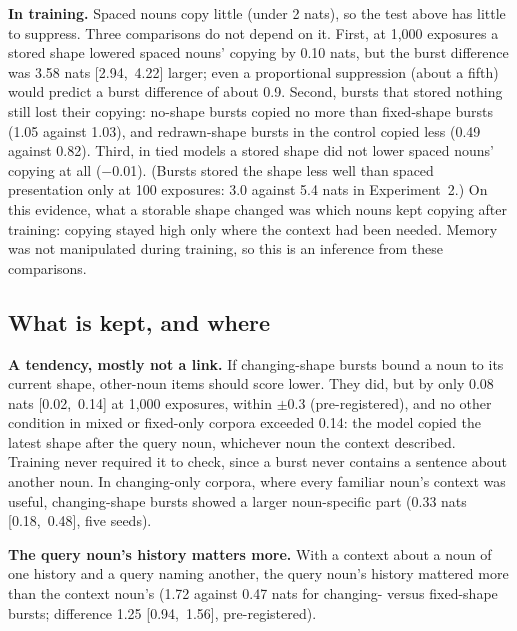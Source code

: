 \documentclass[11pt]{article}
\begin{document}
\textbf{In training.} Spaced nouns copy little (under 2 nats), so the test above has little to suppress. Three comparisons do not depend on it. First, at 1,000 exposures a stored shape lowered spaced nouns' copying by 0.10 nats, but the burst difference was 3.58 nats [2.94,~4.22] larger; even a proportional suppression (about a fifth) would predict a burst difference of about 0.9. Second, bursts that stored nothing still lost their copying: no-shape bursts copied no more than fixed-shape bursts (1.05 against 1.03), and redrawn-shape bursts in the control copied less (0.49 against 0.82). Third, in tied models a stored shape did not lower spaced nouns' copying at all ($-$0.01). (Bursts stored the shape less well than spaced presentation only at 100 exposures: 3.0 against 5.4 nats in Experiment~2.) On this evidence, what a storable shape changed was which nouns kept copying after training: copying stayed high only where the context had been needed. Memory was not manipulated during training, so this is an inference from these comparisons.

\subsection{What is kept, and where}\label{sec:kept}
\textbf{A tendency, mostly not a link.} If changing-shape bursts bound a noun to its current shape, other-noun items should score lower. They did, but by only 0.08 nats [0.02,~0.14] at 1,000 exposures, within $\pm$0.3 (pre-registered), and no other condition in mixed or fixed-only corpora exceeded 0.14: the model copied the latest shape after the query noun, whichever noun the context described. Training never required it to check, since a burst never contains a sentence about another noun. In changing-only corpora, where every familiar noun's context was useful, changing-shape bursts showed a larger noun-specific part (0.33 nats [0.18,~0.48], five seeds).

\textbf{The query noun's history matters more.} With a context about a noun of one history and a query naming another, the query noun's history mattered more than the context noun's (1.72 against 0.47 nats for changing- versus fixed-shape bursts; difference 1.25 [0.94,~1.56], pre-registered).
\end{document}
